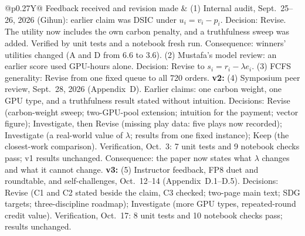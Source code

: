 \begin{table}[H]
\begin{tabularx}{\textwidth}{@{}p{}Y@{}}
Feedback received and revision made & (1) Internal audit, Sept.~25--26, 2026 (Gihun): earlier claim was DSIC under $u_i=v_i-p_i$. Decision: Revise. The utility now includes the own carbon penalty, and a truthfulness sweep was added. Verified by unit tests and a notebook fresh run. Consequence: winners' utilities changed (A and D from 6.6 to 3.6). (2) Mustafa's model review: an earlier score used GPU-hours alone. Decision: Revise to $s_i=r_i-\lambda e_i$. (3) FCFS generality: Revise from one fixed queue to all 720 orders. \textbf{v2:} (4) Symposium peer review, Sept.~28, 2026 (Appendix~D). Earlier claims: one carbon weight, one GPU type, and a truthfulness result stated without intuition. Decisions: Revise (carbon-weight sweep; two-GPU-pool extension; intuition for the payment; vector figure); Investigate, then Revise (missing play data: five plays now recorded); Investigate (a real-world value of $\lambda$; results from one fixed instance); Keep (the closest-work comparison). Verification, Oct.~3: 7 unit tests and 9 notebook checks pass; v1 results unchanged. Consequence: the paper now states what $\lambda$ changes and what it cannot change. \textbf{v3:} (5) Instructor feedback, FP8 duet and roundtable, and self-challenges, Oct.~12--14 (Appendix~D.1--D.5). Decisions: Revise (C1 and C2 stated beside the claim, C3 checked; two-page main text; SDG targets; three-discipline roadmap); Investigate (more GPU types, repeated-round credit value). Verification, Oct.~17: 8 unit tests and 10 notebook checks pass; results unchanged. \\
\bottomrule
\end{tabularx}
\end{table}

